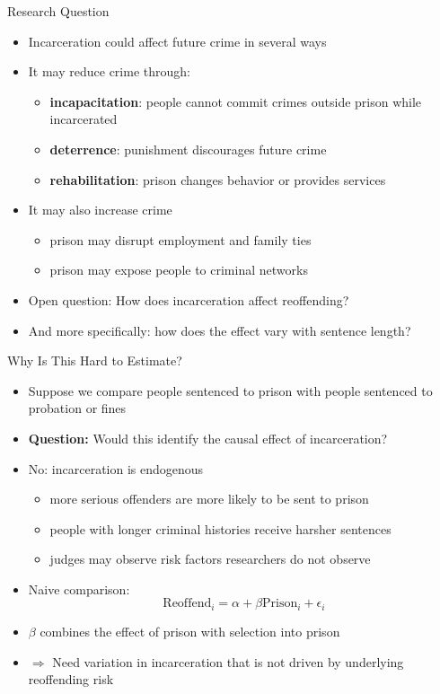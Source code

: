 \documentclass[11pt,notes=hide,aspectratio=169,mathserif]{beamer}
\begin{document}
\begin{frame}{Research Question}
\begin{itemize}
\item Incarceration could affect future crime in several ways
\pause \item It may reduce crime through:
\begin{itemize}
\pause \item \textbf{incapacitation}: people cannot commit crimes outside prison while incarcerated
\pause \item \textbf{deterrence}: punishment discourages future crime
\pause \item \textbf{rehabilitation}: prison changes behavior or provides services
\end{itemize}
\pause \item It may also increase crime
\begin{itemize}
\pause \item prison may disrupt employment and family ties
\pause \item prison may expose people to criminal networks
\end{itemize}
\pause \item Open question: How does incarceration affect reoffending?
\pause \item And more specifically: how does the effect vary with sentence length?
\end{itemize}
\end{frame}

\begin{frame}{Why Is This Hard to Estimate?}
\begin{itemize}
\item Suppose we compare people sentenced to prison with people sentenced to probation or fines
\item \textbf{Question:} Would this identify the causal effect of incarceration?
\pause \item No: incarceration is endogenous
\begin{itemize}
\pause \item more serious offenders are more likely to be sent to prison
\pause  \item people with longer criminal histories receive harsher sentences
\pause  \item judges may observe risk factors researchers do not observe
\end{itemize}
\pause \item Naive comparison:
\[
\text{Reoffend}_i=\alpha+\beta \text{Prison}_i+\epsilon_i
\]
\pause \item $\beta$ combines the effect of prison with selection into prison
\pause \item $\Rightarrow$ Need variation in incarceration that is not driven by underlying reoffending risk
\end{itemize}
\end{frame}
\end{document}
